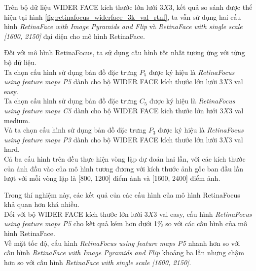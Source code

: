 {    \noindent
    Trên bộ dữ liệu WIDER FACE kích thước lớn lưới $3 X 3$, kết quả so sánh được thể hiện tại hình \ref{fig:retinafocus_widerface_3k_val_rtnf}, ta vẫn sử dụng hai cấu hình \textit{RetinaFace with Image Pyramids and Flip} và \textit{RetinaFace with single scale [1600, 2150]} đại diện cho mô hình RetinaFace.

    \noindent
    Đối với mô hình RetinaFocus, ta sử dụng cấu hình tốt nhất tương ứng với từng bộ dữ liệu. \\
    Ta chọn cấu hình sử dụng bản đồ đặc trưng $P_5$ được ký hiệu là \textit{RetinaFocus using feature maps P5} dành cho bộ WIDER FACE kích thước lớn lưới $3 X 3$ val easy. \\
    Ta chọn cấu hình sử dụng bản đồ đặc trưng $C_5$ được ký hiệu là \textit{RetinaFocus using feature maps C5} dành cho bộ WIDER FACE kích thước lớn lưới $3 X 3$ val medium. \\
    Và ta chọn cấu hình sử dụng bản đồ đặc trưng $P_3$ được ký hiệu là \textit{RetinaFocus using feature maps P3} dành cho bộ WIDER FACE kích thước lớn lưới $3 X 3$ val hard. \\
    Cả ba cấu hình trên đều thực hiện vòng lặp dự đoán hai lần, với các kích thước của ảnh đầu vào của mô hình tương đương với kích thước ảnh gốc ban đầu lần lượt với mỗi vòng lặp là [800, 1200] điểm ảnh và [1600, 2400] điểm ảnh.

    \noindent
    Trong thí nghiệm này, các kết quả của các cấu hình của mô hình RetinaFocus khả quan hơn khá nhiều. \\
    Đối với bộ WIDER FACE kích thước lớn lưới $3 X 3$ val easy, cấu hình \textit{RetinaFocus using feature maps P5} cho kết quả kém hơn dưới 1\% so với các cấu hình của mô hình RetinaFace. \\
    Về mặt tốc độ, cấu hình \textit{RetinaFocus using feature maps P5} nhanh hơn so với cấu hình \textit{RetinaFace with Image Pyramids and Flip} khoảng ba lần nhưng chậm hơn so với cấu hình \textit{RetinaFace with single scale [1600, 2150]}.

}
